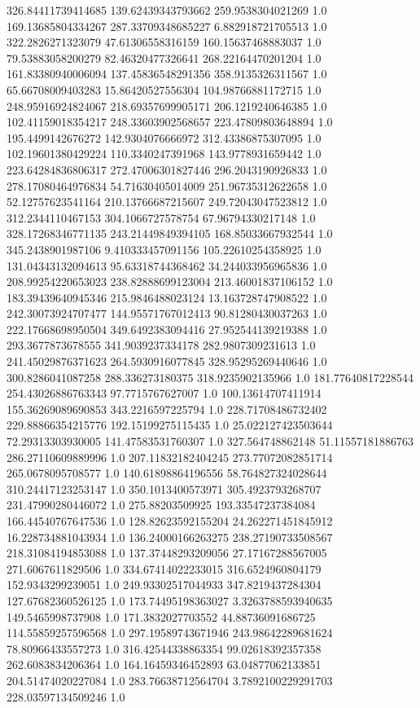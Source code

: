 326.84411739414685	139.62439343793662	259.9538304021269	1.0
169.13685804334267	287.33709348685227	6.882918721705513	1.0
322.2826271323079	47.61306558316159	160.15637468883037	1.0
79.53883058200279	82.46320477326641	268.22164470201204	1.0
161.83380940006094	137.45836548291356	358.9135326311567	1.0
65.66708009403283	15.86420527556304	104.98766881172715	1.0
248.95916924824067	218.69357699905171	206.1219240646385	1.0
102.41159018354217	248.33603902568657	223.47809803648894	1.0
195.4499142676272	142.9304076666972	312.43386875307095	1.0
102.19601380429224	110.3340247391968	143.9778931659442	1.0
223.64284836806317	272.47006301827446	296.2043190926833	1.0
278.17080464976834	54.71630405014009	251.96735312622658	1.0
52.12757623541164	210.13766687215607	249.72043047523812	1.0
312.2344110467153	304.1066727578754	67.96794330217148	1.0
328.17268346771135	243.21449849394105	168.85033667932544	1.0
345.2438901987106	9.410333457091156	105.22610254358925	1.0
131.04343132094613	95.63318744368462	34.244033956965836	1.0
208.99254220653023	238.82888699123004	213.46001837106152	1.0
183.39439640945346	215.9846488023124	13.163728747908522	1.0
242.30073924707477	144.95571767012413	90.81280430037263	1.0
222.17668698950504	349.6492383094416	27.952544139219388	1.0
293.3677873678555	341.9039237334178	282.9807309231613	1.0
241.45029876371623	264.5930916077845	328.95295269440646	1.0
300.8286041087258	288.336273180375	318.9235902135966	1.0
181.77640817228544	254.43026886763343	97.7715767627007	1.0
100.13614707411914	155.36269089690853	343.2216597225794	1.0
228.71708486732402	229.88866354215776	192.15199275115435	1.0
25.022127423503644	72.29313303930005	141.47583531760307	1.0
327.564748862148	51.11557181886763	286.27110609889996	1.0
207.11832182404245	273.77072082851714	265.0678095708577	1.0
140.61898864196556	58.764827324028644	310.24417123253147	1.0
350.1013400573971	305.4923793268707	231.47990280446072	1.0
275.88203509925	193.33547237384084	166.44540767647536	1.0
128.82623592155204	24.262271451845912	16.228734881043934	1.0
136.24000166263275	238.27190733508567	218.31084194853088	1.0
137.37448293209056	27.17167288567005	271.6067611829506	1.0
334.67414022233015	316.6524960804179	152.9343299239051	1.0
249.93302517044933	347.8219437284304	127.67682360526125	1.0
173.74495198363027	3.3263788593940635	149.5465998737908	1.0
171.3832027703552	44.88736091686725	114.55859257596568	1.0
297.19589743671946	243.98642289681624	78.80966433557273	1.0
316.42544338863354	99.02618392357358	262.6083834206364	1.0
164.16459346452893	63.04877062133851	204.51474020227084	1.0
283.76638712564704	3.7892100229291703	228.03597134509246	1.0
